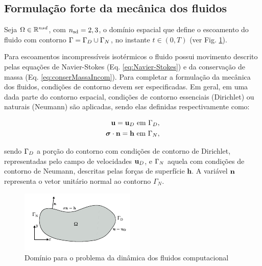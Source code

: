 \documentclass[tese_patricia]{subfiles}%
\begin{document}
\subsection{Formulação forte da mecânica dos fluidos}

Seja $\Omega \in \mathbb{R}^{nsd}$, com ${n_{\mathrm{sd}}} = 2,3$, o domínio espacial que define o escoamento do fluido com contorno $\Gamma = \Gamma_D \cup \Gamma_N$, no instante $t \in (0,T)$ (ver Fig. \ref{fig:DomFluid}).

Para escoamentos incompressíveis isotérmicos o fluido possui movimento descrito pelas equações de Navier-Stokes (Eq. \ref{eq:Navier-Stokes}) e da conservação de massa (Eq. \ref{eq:conserMassaIncom}). Para completar a formulação da mecânica dos fluidos, condições de contorno devem ser especificadas. Em geral, em uma dada parte do contorno espacial, condições de contorno essenciais (Dirichlet) ou naturais (Neumann) são aplicadas, sendo elas definidas respectivamente como:

\begin{align}
	\mathbf{u} = \mathbf{u}_D \ \textrm{em} \ \Gamma_{D} \label{eq:Dir},\\
	\boldsymbol{\sigma} \cdot \mathbf{n} = \mathbf{h} \ \textrm{em} \ \Gamma_{N}, \label{eq:Neu}
\end{align}

\noindent sendo $\Gamma_{D}$ a porção do contorno com condições de contorno de Dirichlet, representadas pelo campo de velocidades $\mathbf{u}_D$, e $\Gamma_{N}$ aquela com condições de contorno de Neumann, descritas pelas forças de superfície $\mathbf{h}$. A variável $\mathbf{n}$ representa o vetor unitário normal ao contorno $\Gamma_{N}$.

\begin{figure}[htb!]
	\centering 
	\includegraphics[scale=2.0,trim=0cm 0.0cm 0cm 0.0cm, clip=true]{Imagens/Cap2/dominiofluido.pdf}	
	\caption{Domínio para o problema da dinâmica dos fluidos computacional}
	\label{fig:DomFluid}
\end{figure}
\end{document}
